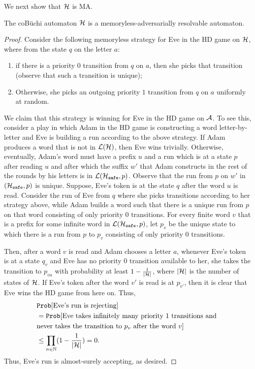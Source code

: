 We next show that $\mathcal{H}$ is MA.
\begin{lemma}\label{lemma:cobuchi-h-is-ma}
    The coB\"uchi automaton $\mathcal{H}$ is a memoryless-adversarially resolvable automaton.
\end{lemma}
\begin{proof}
    Consider the following memoryless strategy for Eve in the HD game on $\mathcal{H}$, where from the state $q$ on the letter $a$:
    \begin{enumerate}
        \item if there is a priority $0$ transition from $q$ on $a$, then she picks that transition (observe that such a transition is unique);
        \item Otherwise, she picks an outgoing priority $1$ transition from $q$ on $a$ uniformly at random.
    \end{enumerate}
    We claim that this strategy is winning for Eve in the HD game on $\mathcal{A}$. To see this, consider a play in which Adam in the HD game is constructing a word letter-by-letter and Eve is building a run according to the above strategy. If Adam produces a word that is not in $\mathcal{L}(\mathcal{H})$, then Eve wins trivially. Otherwise, eventually, Adam's word must have a prefix $u$ and a run which is at a state $p$ after reading $u$ and after which the suffix $w'$ that Adam constructs in the rest of the rounds by his letters is in $\mathcal{L}(\mathcal{H}_{\texttt{safe}},p)$. Observe that the run from $p$ on $w'$ in $(\mathcal{H}_{\texttt{safe}},p)$ is unique.
    Suppose, Eve's token is at the state $q$ after the word $u$ is read. Consider the run of Eve from $q$ where she picks transitions according to her strategy above, while Adam builds a word such that there is a unique run from $p$ on that word consisting of only priority 0 transitions. For every finite word $v$ that is a prefix for some infinite word in $\mathcal{L}(\mathcal{H}_{\texttt{safe}},p)$, let $p_v$ be the unique state to which there is a run from $p$ to $p_v$ consisting of only priority 0 transitions.
    
    Then, after a word $v$ is read and Adam chooses a letter $a$, whenever Eve's token is at a state $q_v$ and Eve has no priority $0$ transition available to her, she takes the transition to $p_{va}$ with probability at least $1-\frac{1}{\lvert \mathcal{H} \rvert}$, where $\lvert \mathcal{H} \rvert$ is the number of states of $\mathcal{H}$. If Eve's token after the word $v'$ is read is at $p_{v'}$, then it is clear that Eve wins the HD game from here on. Thus, 
    \begin{equation*}
        \begin{split}
            &\mathtt{Prob}[\text{Eve's run is rejecting}]\\ 
            &= \mathtt{Prob}[\text{Eve takes infinitely many priority $1$ transitions and } \\ &\text{never takes the transition to $p_v$ after the word $v$}] \\ 
            &\leq \prod_{n\in\mathbb{N}} (1-\frac{1}{|\mathcal{H}|}) = 0. 
        \end{split}
    \end{equation*}
    Thus, Eve's run is almost-surely accepting, as desired.
\end{proof}

